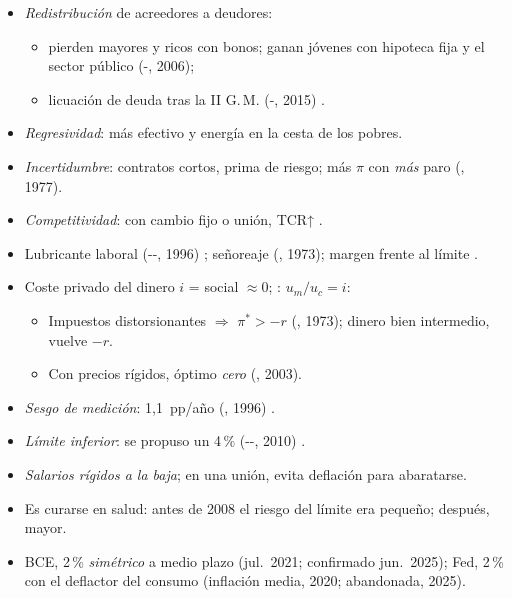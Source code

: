 \documentclass{article}
\begin{document}
\begin{columnas}
\begin{itemize}
\end{itemize}
\begin{itemize}
\item \emph{Redistribución} de acreedores a deudores:
  \begin{itemize}
  \item pierden mayores y ricos con bonos; ganan jóvenes con hipoteca fija y el sector público (-, 2006);
  \item licuación de deuda tras la II G.\,M. (-, 2015) .
  \end{itemize}
\item \emph{Regresividad}: más efectivo y energía en la cesta de los pobres.
\item \emph{Incertidumbre}: contratos cortos, prima de riesgo; más $\pi$ con \emph{más} paro (, 1977).
\item \emph{Competitividad}: con cambio fijo o unión, TCR↑ .
\end{itemize}
\begin{itemize}
\item Lubricante laboral (--, 1996) ; señoreaje (, 1973); margen frente al límite .
\end{itemize}

\begin{itemize}
\item Coste privado del dinero $i$ = social $\approx0$; : $u_m/u_c=i$:
  \begin{itemize}
  \item Impuestos distorsionantes $\Rightarrow$ $\pi^*>-r$ (, 1973); dinero bien intermedio, vuelve $-r$.
  \item Con precios rígidos, óptimo \emph{cero} (, 2003).
  \end{itemize}
\end{itemize}
\begin{itemize}
\item \emph{Sesgo de medición}: 1,1~pp/año (, 1996) .
\item \emph{Límite inferior}: se propuso un 4\,\% (--, 2010) .
\item \emph{Salarios rígidos a la baja}; en una unión, evita deflación para abaratarse.
\item Es curarse en salud: antes de 2008 el riesgo del límite era pequeño; después, mayor.
\item BCE, 2\,\% \emph{simétrico} a medio plazo (jul.\ 2021; confirmado jun.\ 2025); Fed, 2\,\% con el deflactor del consumo (inflación media, 2020; abandonada, 2025).
\end{itemize}


\end{columnas}
\end{document}
